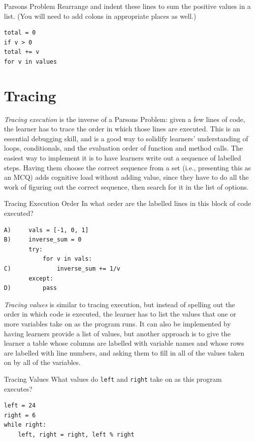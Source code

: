 \begin{aside}{Parsons Problem}
  Rearrange and indent these lines to sum the positive values in a list.
  (You will need to add colons in appropriate places as well.)

\begin{verbatim}
total = 0
if v > 0
total += v
for v in values
\end{verbatim}
\end{aside}

\section{Tracing}\label{s:exercises-tracing}

\emph{Tracing execution} is the inverse of a Parsons Problem: given a few
lines of code, the learner has to trace the order in which those lines
are executed. This is an essential debugging skill, and is a good way to
solidify learners' understanding of loops, conditionals, and the
evaluation order of function and method calls. The easiest way to
implement it is to have learners write out a sequence of labelled steps.
Having them choose the correct sequence from a set (i.e., presenting
this as an MCQ) adds cognitive load without adding value, since they
have to do all the work of figuring out the correct sequence, then
search for it in the list of options.

\begin{aside}{Tracing Execution Order}
  In what order are the labelled lines in this block of code executed?

\begin{verbatim}
A)     vals = [-1, 0, 1]
B)     inverse_sum = 0
       try:
           for v in vals:
C)             inverse_sum += 1/v
       except:
D)         pass
\end{verbatim}
\end{aside}

\emph{Tracing values} is similar to tracing execution, but instead of
spelling out the order in which code is executed, the learner has to
list the values that one or more variables take on as the program runs.
It can also be implemented by having learners provide a list of values,
but another approach is to give the learner a table whose columns are
labelled with variable names and whose rows are labelled with line
numbers, and asking them to fill in all of the values taken on by all of
the variables.

\begin{aside}{Tracing Values}
  What values do \texttt{left} and \texttt{right} take on as this program executes?

\begin{verbatim}
left = 24
right = 6
while right:
    left, right = right, left % right
\end{verbatim}
\end{aside}

